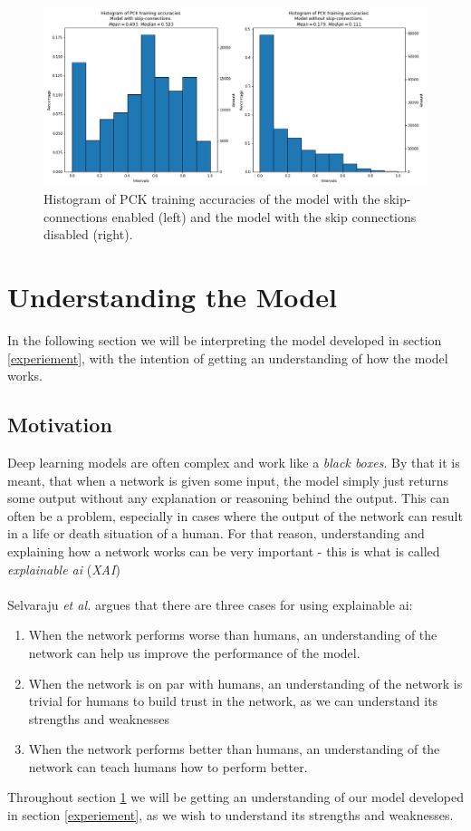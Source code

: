 \documentclass[./main.tex]{subfiles}
\begin{document}
\begin{figure}[htbp]
    \centering
    \includegraphics[height = 6 cm]{entities/PCK_accs_vs.png}
    \caption{Histogram of PCK training accuracies of the model with the skip-connections enabled (left) and the model with the skip connections disabled (right).}
    \label{fig:PCK_accs}
\end{figure}

\section{Understanding the Model}\label{sec:XAI}
In the following section we will be interpreting the model developed in section \ref{experiement}, with the intention of getting an understanding of how the model works.

\subsection{Motivation}
Deep learning models are often complex and work like a \textit{black boxes}. By that it is meant, that when a network is given some input, the model simply just returns some output without any explanation or reasoning behind the output. This can often be a problem, especially in cases where the output of the network can result in a life or death situation of a human. For that reason, understanding and explaining how a network works can be very important - this is what is called \textit{explainable ai} (\textit{XAI}) 
\\
\\
Selvaraju \textit{et al.} \cite{Selvaraju} argues that there are three cases for using explainable ai:
\begin{enumerate}
    \item When the network performs worse than humans, an understanding of the network can help us improve the performance of the model.
    \item When the network is on par with humans, an understanding of the network is trivial for humans to build trust in the network, as we can understand its strengths and weaknesses
    \item When the network performs better than humans, an understanding of the network can teach humans how to perform better.
\end{enumerate}
Throughout section \ref{sec:XAI} we will be getting an understanding of our model developed in section \ref{experiement}, as we wish to understand its strengths and weaknesses.
\end{document}
